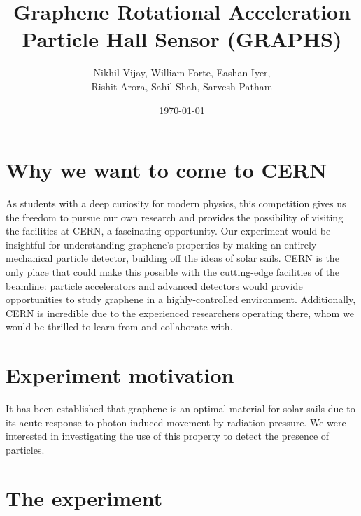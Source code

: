 \documentclass{article}
\title{Graphene Rotational Acceleration\\Particle Hall Sensor (GRAPHS)}
\author{Nikhil Vijay, William Forte, Eashan Iyer,\\Rishit Arora, Sahil Shah, Sarvesh Patham}
\date{\today}
\begin{document}
    \maketitle

    \section{Why we want to come to CERN}
    \indent As students with a deep curiosity for modern physics, this competition gives us the freedom to pursue our own research and provides the possibility of visiting the facilities at CERN, a fascinating opportunity. Our experiment would be insightful for understanding graphene's properties by making an entirely mechanical particle detector, building off the ideas of solar sails. CERN is the only place that could make this possible with the cutting-edge facilities of the beamline: particle accelerators and advanced detectors would provide opportunities to study graphene in a highly-controlled environment. Additionally, CERN is incredible due to the experienced researchers operating there, whom we would be thrilled to learn from and collaborate with.

    \section{Experiment motivation}
    \indent It has been established that graphene is an optimal material for solar sails \cite{GAUDENZI} due to its acute response to photon-induced movement by radiation pressure. We were interested in investigating the use of this property to detect the presence of particles.

    \section{The experiment}
\end{document}
